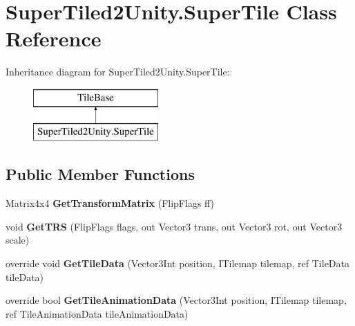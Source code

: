 \hypertarget{class_super_tiled2_unity_1_1_super_tile}{}\section{Super\+Tiled2\+Unity.\+Super\+Tile Class Reference}
\label{class_super_tiled2_unity_1_1_super_tile}
Inheritance diagram for Super\+Tiled2\+Unity.\+Super\+Tile\+:\begin{figure}[H]
\begin{center}
\leavevmode
\includegraphics[height=2.000000cm]{class_super_tiled2_unity_1_1_super_tile}
\end{center}
\end{figure}
\subsection*{Public Member Functions}
\begin{DoxyCompactItemize}
\item 
\mbox{\label{class_super_tiled2_unity_1_1_super_tile_a6375d78c631d3212877d75fc4254d829}} 
Matrix4x4 {\bfseries Get\+Transform\+Matrix} (Flip\+Flags ff)
\item 
\mbox{\label{class_super_tiled2_unity_1_1_super_tile_a20a14bd6bf947223ae39f097230c5f6c}} 
void {\bfseries Get\+T\+RS} (Flip\+Flags flags, out Vector3 trans, out Vector3 rot, out Vector3 scale)
\item 
\mbox{\label{class_super_tiled2_unity_1_1_super_tile_a2db03152709cc52480293d2b936b31ab}} 
override void {\bfseries Get\+Tile\+Data} (Vector3\+Int position, I\+Tilemap tilemap, ref Tile\+Data tile\+Data)
\item 
\mbox{\label{class_super_tiled2_unity_1_1_super_tile_a10046abbe9120f282baa5985cdc1b819}} 
override bool {\bfseries Get\+Tile\+Animation\+Data} (Vector3\+Int position, I\+Tilemap tilemap, ref Tile\+Animation\+Data tile\+Animation\+Data)
\end{DoxyCompactItemize}
